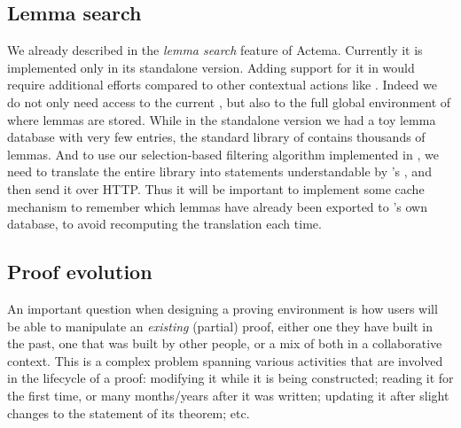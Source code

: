 \subsection{Lemma search}

We already described in  the \emph{lemma search} feature of
Actema. Currently it is implemented only in its standalone version. Adding
support for it in  would require additional efforts compared
to other contextual actions like . Indeed we do not only need
access to the current , but also to the full global environment of  where
lemmas are stored. While in the standalone version we had a toy lemma database
with very few entries, the standard library of  contains thousands of lemmas.
And to use our selection-based filtering algorithm implemented in , we
need to translate the entire library into statements understandable by 's
, and then send it over HTTP. Thus it will be important to
implement some cache mechanism to remember which lemmas have already been
exported to 's own database, to avoid recomputing the translation each
time.



\subsection{Proof evolution}

\AP
An important question when designing a proving environment is how users will be
able to manipulate an \emph{existing} (partial) proof, either one they have
built in the past, one that was built by other people, or a mix of both in a
collaborative context. This is a complex problem spanning various activities
that are involved in the lifecycle of a proof: modifying it while it is being
constructed; reading it for the first time, or many months/years after it was
written; updating it after slight changes to the statement of its theorem;
etc.

